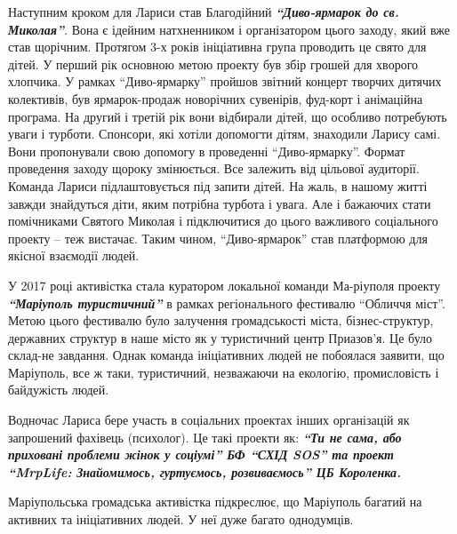 

Наступним кроком для Лариси став Благодійний \textbf{\emph{\enquote{Диво-ярмарок до св. Миколая}}}.
Вона є ідейним натхненником і організатором цього заходу, який вже став
щорічним. Протягом 3-х років ініціативна група проводить це свято для дітей. У
перший рік основною метою проекту був збір грошей для хворого хлопчика. У
рамках \enquote{Диво-ярмарку} пройшов звітний концерт творчих дитячих колективів, був
ярмарок-продаж новорічних сувенірів, фуд-корт і анімаційна програма. На другий
і третій рік вони відбирали дітей, що особливо потребують уваги і турботи.
Спонсори, які хотіли допомогти дітям, знаходили Ларису самі. Вони пропонували
свою допомогу в проведенні \enquote{Диво-ярмарку}. Формат проведення заходу щороку
змінюється. Все залежить від цільової аудиторії. Команда Лариси підлаштовується
під запити дітей. На жаль, в нашому житті завжди знайдуться діти, яким потрібна
турбота і увага. Але і бажаючих стати помічниками Святого Миколая і
підключитися до цього важливого соціального проекту – теж вистачає. Таким
чином, \enquote{Диво-ярмарок} став платформою для якісної взаємодії людей.

У 2017 році активістка стала куратором локальної команди Ма\hyp{}ріуполя проекту
\emph{\textbf{\enquote{Маріуполь туристичний}}} в рамках регіонального фестивалю \enquote{Обличчя міст}. Метою
цього фестивалю було залучення громадськості міста, бізнес-структур, державних
структур в наше місто як у туристичний центр Приазов'я. Це було склад\hyp{}не
завдання. Однак команда ініціативних людей не побоялася заявити, що Маріуполь,
все ж таки, туристичний, незважаючи на екологію, промисловість і байдужість
людей.


Водночас Лариса бере участь в соціальних проектах інших організацій як
запрошений фахівець (психолог). Це такі проекти як: \emph{\textbf{\enquote{Ти не сама, або приховані
проблеми жінок у соціумі} БФ \enquote{СХІД SOS} та проект \enquote{MrpLife: Знайомимось,
гуртуємось, розвиваємось} ЦБ Короленка.} }

Маріупольська громадська активістка підкреслює, що Маріуполь багатий на
активних та ініціативних людей. У неї дуже багато однодумців.

